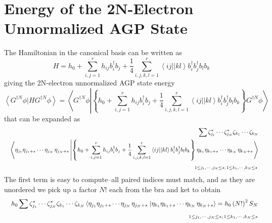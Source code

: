 \documentclass{article}
\begin{document}
\section{Energy of the 2N-Electron Unnormalized AGP State}

The Hamiltonian in the canonical basis can be written as 
\begin{equation}
H=h_{0}+\sum_{i,j=1}^{r}h_{ij}b_{i}^{\dagger }b_{j}+\frac{1}{4}%
\sum_{i,j,k,l=1}^{r}\left\langle ij||kl\right\rangle b_{i}^{\dagger
}b_{j}^{\dagger }b_{l}b_{k}
\end{equation}%
giving the 2N-electron unnormalized AGP state energy\ 
\begin{equation}
\left\langle G^{\dagger N}\phi |HG^{\dagger N}\phi \right\rangle
=\left\langle G^{\dagger N}\phi \left| \left\{
h_{0}+\sum_{i,j=1}^{r}h_{ij}b_{i}^{\dagger }b_{j}+\frac{1}{4}%
\sum_{i,j,k,l=1}^{r}\left\langle ij||kl\right\rangle b_{i}^{\dagger
}b_{j}^{\dagger }b_{l}b_{k}\right\} G^{\dagger N}\phi \right. \right\rangle
\end{equation}%
that can be expanded as 
\begin{eqnarray}
&&\sum \zeta _{j_{1}}^{\ast }\cdots \zeta _{j_{N}}^{\ast }\zeta
_{k_{1}}\cdots \zeta _{k_{N}}  \notag \\
&&\left\langle \eta _{j_{1}}\eta _{j_{1}+s}\cdots \eta _{j_{N}\,}\eta
_{j_{N}+s}\left| \left\{ h_{0}+\sum_{i,j=1}^{r}h_{ij}b_{i}^{\dagger }b_{j}+%
\frac{1}{4}\sum_{i,j,k,l=1}^{r}\left\langle ij||kl\right\rangle
b_{i}^{\dagger }b_{j}^{\dagger }b_{l}b_{k}\right\} \eta _{k_{1}}\eta
_{k_{1}+s}\cdots \eta _{k_{N}\,}\eta _{k_{N}+s}\right. \right\rangle  \notag
\\
&&\qquad \qquad \qquad \qquad \qquad \qquad \qquad \qquad \qquad \qquad
\qquad \qquad \qquad \qquad _{1\leq j_{1},\cdots ,j_{N}\leq s;\,1\leq
k_{1},\cdots ,k_{N}\leq s\,}
\end{eqnarray}%
The first term is easy to compute--all paired indices must match, and as
they are unordered we pick up a factor $N!$ each from the bra and ket to
obtain 
\begin{eqnarray}
&&h_{0}\sum \zeta _{j_{1}}^{\ast }\cdots \zeta _{j_{N}}^{\ast }\zeta
_{k_{1}}\cdots \zeta _{k_{N}}\left\langle \eta _{j_{1}}\eta _{j_{1}+s}\cdots
\eta _{j_{N}\,}\eta _{j_{N}+s}\right. \left| \eta _{k_{1}}\eta
_{k_{1}+s}\cdots \eta _{k_{N}\,}\eta _{k_{N}+s}\right\rangle =h_{0}\left(
N!\right) ^{2}S_{N}  \notag \\
&&\qquad \qquad \qquad \qquad \qquad \qquad \qquad \qquad \qquad \qquad
\qquad _{\quad \qquad 1\leq j_{1},\cdots ,j_{N}\leq s;\,1\leq k_{1},\cdots
,k_{N}\leq s}
\end{eqnarray}%
\end{document}
